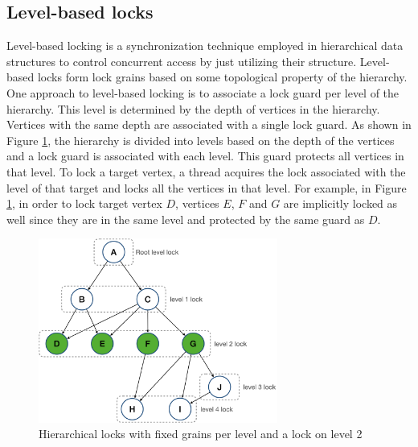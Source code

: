 \subsection{Level-based locks}
Level-based locking is a synchronization technique employed in hierarchical data structures to control concurrent access by just utilizing their structure. Level-based locks form lock grains based on some topological property of the hierarchy.
One approach to level-based locking is to associate a lock guard per level of the hierarchy. This level is determined by the depth of vertices in the hierarchy. Vertices with the same depth are associated with a single lock guard.
As shown in Figure \ref{fig:level_locks}, the hierarchy is divided into levels based on the depth of the vertices and a lock guard is associated with each level. 
This guard protects all vertices in that level.
To lock a target vertex, a thread acquires the lock associated with the level of that target and locks all the vertices in that level.
For example, in Figure \ref{fig:level_locks}, in order to lock target vertex $D$, vertices $E$, $F$ and $G$ are implicitly locked as well since they are in the same level and protected by the same guard as $D$.

\begin{figure}[h]
    \centering
    \captionsetup{justification=centering}
    \includegraphics[width=0.7\textwidth]{figures/FixedGrainLevelLocks.png}
    \caption{Hierarchical locks with fixed grains per level and a lock on level 2}
    \label{fig:level_locks}
\end{figure}

